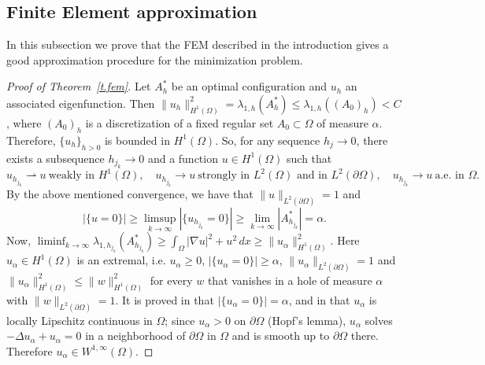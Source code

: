 \documentclass[11pt]{amsart}
\theoremstyle{remark}
\numberwithin{equation}{section}
\begin{document}
\subsection{Finite Element approximation}
In this subsection we prove that the FEM described in the introduction gives a good approximation procedure for the minimization problem.

\begin{proof}[Proof of Theorem~\ref{t.fem}]
Let $A^*_h$ be an optimal configuration and $u_h$ an associated eigenfunction. Then $\|u_h\|^2_{H^1(\Omega)}=\lambda_{1,h}(A^*_h)\le\lambda_{1,h}((A_0)_h)<C$, where $(A_0)_h$ is a discretization of a fixed regular set $A_0\subset\Omega$ of measure $\alpha$. Therefore, $\{u_h\}_{h>0}$ is bounded in $H^1(\Omega)$. So, for any sequence $h_j\to0$, there exists a subsequence $h_{j_k}\to0$ and a function $u\in H^1(\Omega)$ such that
\[
u_{h_{j_k}}\rightharpoonup u\ \text{weakly in } H^1(\Omega),\quad u_{h_{j_k}}\to u\ \text{strongly in } L^2(\Omega)\text{ and in }L^2(\partial\Omega),\quad u_{h_{j_k}}\to u\ \text{a.e. in }\Omega.
\]
By the above mentioned convergence, we have that $\|u\|_{L^2(\partial\Omega)}=1$ and
\[
|\{u=0\}|\ge\limsup_{k\to\infty}|\{u_{h_{j_k}}=0\}|\ge\lim_{k\to\infty}|A^*_{h_{j_k}}|=\alpha.
\]
Now, $\liminf_{k\to\infty}\lambda_{1,h_{j_k}}(A^*_{h_{j_k}})\ge\int_\Omega|\nabla u|^2+u^2\,dx\ge\|u_\alpha\|^2_{H^1(\Omega)}$. Here $u_\alpha\in H^1(\Omega)$ is an extremal, i.e. $u_\alpha\ge0$, $|\{u_\alpha=0\}|\ge\alpha$, $\|u_\alpha\|_{L^2(\partial\Omega)}=1$ and $\|u_\alpha\|^2_{H^1(\Omega)}\le\|w\|^2_{H^1(\Omega)}$ for every $w$ that vanishes in a hole of measure $\alpha$ with $\|w\|_{L^2(\partial\Omega)}=1$. It is proved in \cite{FBRW1} that $|\{u_\alpha=0\}|=\alpha$, and in \cite{FBRW2} that $u_\alpha$ is locally Lipschitz continuous in $\Omega$; since $u_\alpha>0$ on $\partial\Omega$ (Hopf's lemma), $u_\alpha$ solves $-\Delta u_\alpha+u_\alpha=0$ in a neighborhood of $\partial\Omega$ in $\Omega$ and is smooth up to $\partial\Omega$ there. Therefore $u_\alpha\in W^{1,\infty}(\Omega)$.


\end{proof}
\end{document}
